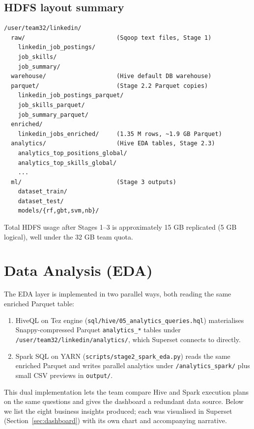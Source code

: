 \documentclass[11pt,a4paper]{article}
\begin{document}
\subsection{HDFS layout summary}
\begin{lstlisting}[style=plain,caption={HDFS directory layout after
Stage 2.}]
/user/team32/linkedin/
  raw/                          (Sqoop text files, Stage 1)
    linkedin_job_postings/
    job_skills/
    job_summary/
  warehouse/                    (Hive default DB warehouse)
  parquet/                      (Stage 2.2 Parquet copies)
    linkedin_job_postings_parquet/
    job_skills_parquet/
    job_summary_parquet/
  enriched/
    linkedin_jobs_enriched/     (1.35 M rows, ~1.9 GB Parquet)
  analytics/                    (Hive EDA tables, Stage 2.3)
    analytics_top_positions_global/
    analytics_top_skills_global/
    ...
  ml/                           (Stage 3 outputs)
    dataset_train/
    dataset_test/
    models/{rf,gbt,svm,nb}/
\end{lstlisting}

Total HDFS usage after Stages 1--3 is approximately 15 GB replicated
(5 GB logical), well under the 32 GB team quota.

\section{Data Analysis (EDA)}
\label{sec:eda}

The EDA layer is implemented in two parallel ways, both reading the
same enriched Parquet table:

\begin{enumerate}[leftmargin=*]
  \item HiveQL on Tez engine
    (\texttt{sql/hive/05\_analytics\_queries.hql}) materialises
    Snappy-compressed Parquet \texttt{analytics\_*} tables under
    \texttt{/user/team32/linkedin/analytics/}, which Superset connects
    to directly.
  \item Spark SQL on YARN
    (\texttt{scripts/stage2\_spark\_eda.py}) reads the same enriched
    Parquet and writes parallel analytics under
    \texttt{/analytics\_spark/} plus small CSV previews in
    \texttt{output/}.
\end{enumerate}

This dual implementation lets the team compare Hive and Spark
execution plans on the same questions and gives the dashboard a
redundant data source.  Below we list the eight business insights
produced; each was visualised in Superset
(Section~\ref{sec:dashboard}) with its own chart and accompanying
narrative.
\end{document}
